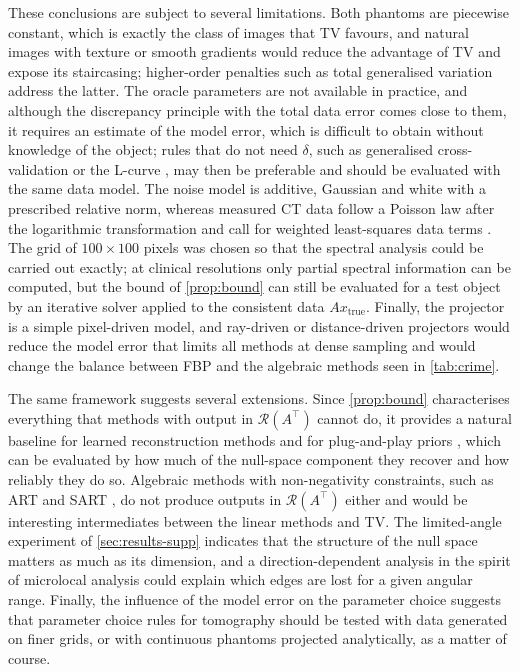 \documentclass[11pt,a4paper]{article}
\numberwithin{equation}{section}
\theoremstyle{remark}
\newcommand{\RR}{\mathcal{R}}
\newcommand{\xt}{x_{\mathrm{true}}}
\newcommand{\T}{\top}
\begin{document}
These conclusions are subject to several limitations. Both phantoms are piecewise constant, which is exactly the class of images that TV favours, and natural images with texture or smooth gradients would reduce the advantage of TV and expose its staircasing; higher-order penalties such as total generalised variation \citep{bredies2010} address the latter. The oracle parameters are not available in practice, and although the discrepancy principle with the total data error comes close to them, it requires an estimate of the model error, which is difficult to obtain without knowledge of the object; rules that do not need $\delta$, such as generalised cross-validation \citep{golub1979} or the L-curve \citep{hansen1992}, may then be preferable and should be evaluated with the same data model. The noise model is additive, Gaussian and white with a prescribed relative norm, whereas measured CT data follow a Poisson law after the logarithmic transformation and call for weighted least-squares data terms \citep{herman2009}. The grid of $100\times100$ pixels was chosen so that the spectral analysis could be carried out exactly; at clinical resolutions only partial spectral information can be computed, but the bound of \cref{prop:bound} can still be evaluated for a test object by an iterative solver applied to the consistent data $A\xt$. Finally, the projector is a simple pixel-driven model, and ray-driven \citep{siddon1985} or distance-driven \citep{deman2004} projectors would reduce the model error that limits all methods at dense sampling and would change the balance between FBP and the algebraic methods seen in \cref{tab:crime}.

The same framework suggests several extensions. Since \cref{prop:bound} characterises everything that methods with output in $\RR(A^\T)$ cannot do, it provides a natural baseline for learned reconstruction methods \citep{jin2017,adler2018} and for plug-and-play priors \citep{venkatakrishnan2013}, which can be evaluated by how much of the null-space component they recover and how reliably they do so. Algebraic methods with non-negativity constraints, such as ART \citep{gordon1970} and SART \citep{andersen1984}, do not produce outputs in $\RR(A^\T)$ either and would be interesting intermediates between the linear methods and TV. The limited-angle experiment of \cref{sec:results-supp} indicates that the structure of the null space matters as much as its dimension, and a direction-dependent analysis in the spirit of microlocal analysis \citep{quinto1993} could explain which edges are lost for a given angular range. Finally, the influence of the model error on the parameter choice suggests that parameter choice rules for tomography should be tested with data generated on finer grids, or with continuous phantoms projected analytically, as a matter of course.
\end{document}
